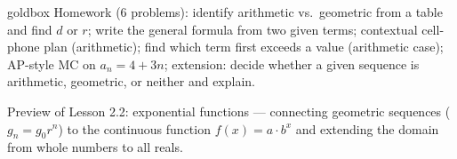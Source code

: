 \documentclass[10pt]{article}
\begin{document}
\begin{skillbox}{goldbox}
Homework (6 problems): identify arithmetic vs.\ geometric from a table and find $d$ or $r$;
write the general formula from two given terms; contextual cell-phone plan (arithmetic);
find which term first exceeds a value (arithmetic case); AP-style MC on $a_n = 4 + 3n$;
extension: decide whether a given sequence is arithmetic, geometric, or neither and explain.

Preview of Lesson 2.2: exponential functions --- connecting geometric sequences ($g_n = g_0 r^n$)
to the continuous function $f(x) = a \cdot b^x$ and extending the domain from whole numbers to all reals.
\end{skillbox}
\end{document}
